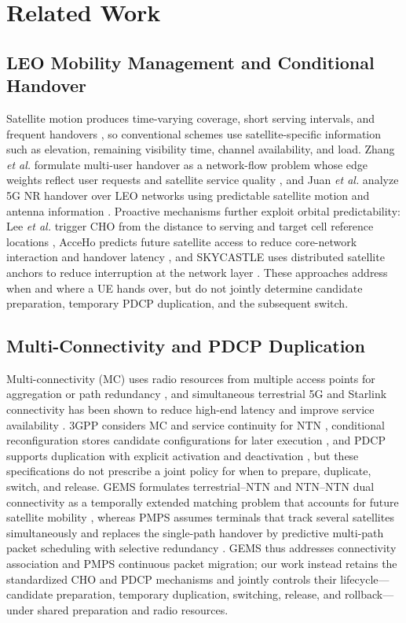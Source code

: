 \documentclass[journal]{IEEEtran}
\begin{document}
\section{Related Work}
\label{sec:related}

\subsection{LEO Mobility Management and Conditional Handover}

Satellite motion produces time-varying coverage, short serving intervals, and
frequent handovers \cite{ji2021mobility}, so conventional schemes use
satellite-specific information such as elevation, remaining visibility time,
channel availability, and load. Zhang \emph{et al.} formulate multi-user
handover as a network-flow problem whose edge weights reflect user requests
and satellite service quality \cite{zhang2021networkflow}, and Juan
\emph{et al.} analyze 5G NR handover over LEO networks using predictable
satellite motion and antenna information \cite{juan2022handover}. Proactive
mechanisms further exploit orbital predictability: Lee \emph{et al.} trigger
CHO from the distance to serving and target cell reference locations
\cite{lee2023locationcho}, AcceHo predicts future satellite access to reduce
core-network interaction and handover latency \cite{wu2024acceho}, and
SKYCASTLE uses distributed satellite anchors to reduce interruption at the
network layer \cite{li2024skycastle}. These approaches address when and where
a UE hands over, but do not jointly determine candidate preparation, temporary
PDCP duplication, and the subsequent switch.

\subsection{Multi-Connectivity and PDCP Duplication}

Multi-connectivity (MC) uses radio resources from multiple access points for
aggregation or path redundancy \cite{pupiales2021mc}, and simultaneous
terrestrial 5G and Starlink connectivity has been shown to reduce high-end
latency and improve service availability \cite{lopez2022empiricalmc}. 3GPP
considers MC and service continuity for NTN \cite{3gpp38821}, conditional
reconfiguration stores candidate configurations for later execution
\cite{3gpp38331}, and PDCP supports duplication with explicit activation and
deactivation \cite{3gpp38323}, but these specifications do not prescribe a
joint policy for when to prepare, duplicate, switch, and release. GEMS
formulates terrestrial--NTN and NTN--NTN dual connectivity as a temporally
extended matching problem that accounts for future satellite mobility
\cite{wang2026gems}, whereas PMPS assumes terminals that track several
satellites simultaneously and replaces the single-path handover by predictive
multi-path packet scheduling with selective redundancy \cite{wang2026pmps}.
GEMS thus addresses connectivity association and PMPS continuous packet
migration; our work instead retains the standardized CHO and PDCP mechanisms
and jointly controls their lifecycle---candidate preparation, temporary
duplication, switching, release, and rollback---under shared preparation and
radio resources.
\end{document}
